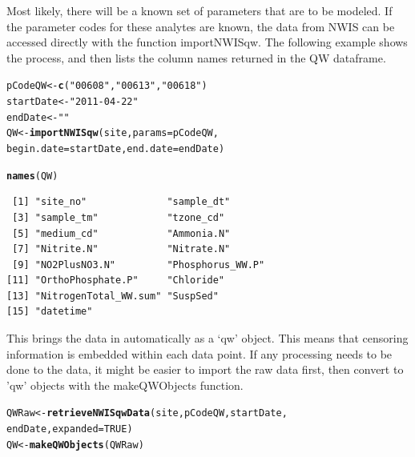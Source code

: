 \documentclass[a4paper,11pt]{article}\usepackage[]{graphicx}\usepackage[]{color}
\makeatletter
\newcommand{\hlnum}[1]{\textcolor[rgb]{0.686,0.059,0.569}{#1}}%
\newcommand{\hlstr}[1]{\textcolor[rgb]{0.192,0.494,0.8}{#1}}%
\newcommand{\hlstd}[1]{\textcolor[rgb]{0.345,0.345,0.345}{#1}}%
\newcommand{\hlkwb}[1]{\textcolor[rgb]{0.69,0.353,0.396}{#1}}%
\newcommand{\hlkwc}[1]{\textcolor[rgb]{0.333,0.667,0.333}{#1}}%
\newcommand{\hlkwd}[1]{\textcolor[rgb]{0.737,0.353,0.396}{\textbf{#1}}}%
\newenvironment{kframe}{%
 \def\at@end@of@kframe{}%
 \ifinner\ifhmode%
  \def\at@end@of@kframe{\end{minipage}}%
  \begin{minipage}{\columnwidth}%
 \fi\fi%
 \def\FrameCommand##1{\hskip\@totalleftmargin \hskip-\fboxsep
 \colorbox{shadecolor}{##1}\hskip-\fboxsep
     \hskip-\linewidth \hskip-\@totalleftmargin \hskip\columnwidth}%
 \MakeFramed {\advance\hsize-\width
   \@totalleftmargin\z@ \linewidth\hsize
   \@setminipage}}%
 {\par\unskip\endMakeFramed%
 \at@end@of@kframe}
\newenvironment{knitrout}{}{} %
\makeatother
\begin{document}
Most likely, there will be a known set of parameters that are to be modeled. If the parameter codes for these analytes are known, the data from NWIS can be accessed directly with the function importNWISqw. The following example shows the process, and then lists the column names returned in the QW dataframe.


\begin{knitrout}
\color{fgcolor}\begin{kframe}
\begin{alltt}
\hlstd{pCodeQW} \hlkwb{<-} \hlkwd{c}\hlstd{(}\hlstr{"00608"}\hlstd{,}\hlstr{"00613"}\hlstd{,}\hlstr{"00618"}\hlstd{)}
\hlstd{startDate} \hlkwb{<-} \hlstr{"2011-04-22"}
\hlstd{endDate} \hlkwb{<-} \hlstr{""}
\hlstd{QW} \hlkwb{<-} \hlkwd{importNWISqw}\hlstd{(site,} \hlkwc{params}\hlstd{=pCodeQW,}
                   \hlkwc{begin.date}\hlstd{=startDate,} \hlkwc{end.date}\hlstd{=endDate)}
\end{alltt}
\end{kframe}
\end{knitrout}





\begin{knitrout}
\color{fgcolor}\begin{kframe}
\begin{alltt}
\hlkwd{names}\hlstd{(QW)}
\end{alltt}
\begin{verbatim}
 [1] "site_no"              "sample_dt"           
 [3] "sample_tm"            "tzone_cd"            
 [5] "medium_cd"            "Ammonia.N"           
 [7] "Nitrite.N"            "Nitrate.N"           
 [9] "NO2PlusNO3.N"         "Phosphorus_WW.P"     
[11] "OrthoPhosphate.P"     "Chloride"            
[13] "NitrogenTotal_WW.sum" "SuspSed"             
[15] "datetime"            
\end{verbatim}
\end{kframe}
\end{knitrout}



This brings the data in automatically as a `qw' object. This means that censoring information is embedded within each data point. If any processing needs to be done to the data, it might be easier to import the raw data first, then convert to 'qw' objects with the makeQWObjects function.

\begin{knitrout}
\color{fgcolor}\begin{kframe}
\begin{alltt}
\hlstd{QWRaw} \hlkwb{<-} \hlkwd{retrieveNWISqwData}\hlstd{(site,pCodeQW,startDate,}
                            \hlstd{endDate,}\hlkwc{expanded}\hlstd{=}\hlnum{TRUE}\hlstd{)}
\hlstd{QW} \hlkwb{<-} \hlkwd{makeQWObjects}\hlstd{(QWRaw)}
\end{alltt}
\end{kframe}
\end{knitrout}
\end{document}

